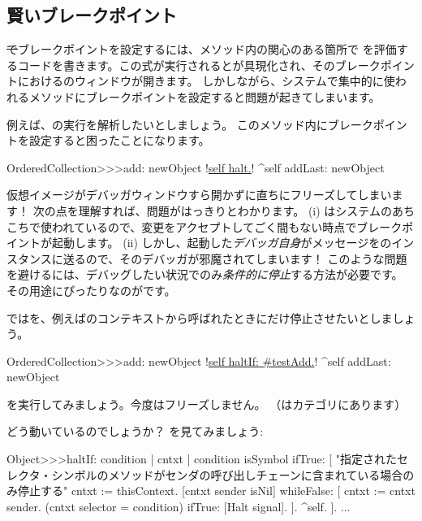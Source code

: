 \documentclass[a4paper,10pt,twoside]{book}
\begin{document}
\subsection{賢いブレークポイント}

\st でブレークポイントを設定するには、メソッド内の関心のある箇所で  を評価するコードを書きます。この式が実行されるとが具現化され、そのブレークポイントにおけるのウィンドウが開きます。
しかしながら、システムで集中的に使われるメソッドにブレークポイントを設定すると問題が起きてしまいます。

例えば、の実行を解析したいとしましょう。
このメソッド内にブレークポイントを設定すると困ったことになります。

\begin{code}{}
OrderedCollection>>>add: newObject
	!\underline{self halt.}!
	^self addLast: newObject
\end{code}

仮想イメージがデバッガウィンドウすら開かずに直ちにフリーズしてしまいます！
次の点を理解すれば、問題がはっきりとわかります。 (i) はシステムのあちこちで使われているので、変更をアクセプトしてごく間もない時点でブレークポイントが起動します。 (ii) しかし、起動した\emph{デバッガ自身}がメッセージをのインスタンスに送るので、そのデバッガが邪魔されてしまいます！
このような問題を避けるには、デバッグしたい状況でのみ\emph{条件的に停止}する方法が必要です。
その用途にぴったりなのがです。

ではを、例えばのコンテキストから呼ばれたときにだけ停止させたいとしましょう。

\begin{code}{}
OrderedCollection>>>add: newObject
	!\underline{self haltIf: \#testAdd.}!
	^self addLast: newObject
\end{code}

を実行してみましょう。今度はフリーズしません。
（はカテゴリにあります）

どう動いているのでしょうか？ を見てみましょう:
\begin{code}{}
Object>>>haltIf: condition
	| cntxt |
	condition isSymbol ifTrue: [
		"指定されたセレクタ・シンボルのメソッドがセンダの呼び出しチェーンに含まれている場合のみ停止する"
		cntxt := thisContext.
		[cntxt sender isNil] whileFalse: [
			cntxt := cntxt sender. 
			(cntxt selector = condition) ifTrue: [Halt signal]. ].
		^self.
	].
	...
\end{code}
\end{document}
